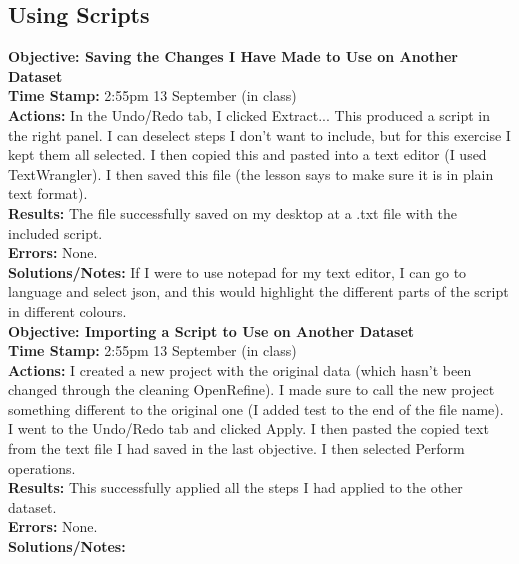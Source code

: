 \documentclass{article}
\begin{document}
\begin{FlushLeft}
\subsection{Using Scripts}
\textbf{Objective: Saving the Changes I Have Made to Use on Another Dataset}\\ 
\textbf{Time Stamp:} 2:55pm 13 September (in class)\\
\textbf{Actions:} In the Undo/Redo tab, I clicked Extract... This produced a script in the right panel. I can deselect steps I don't want to include, but for this exercise I kept them all selected. I then copied this and pasted into a text editor (I used TextWrangler). I then saved this file (the lesson says to make sure it is in plain text format).\\
\textbf{Results:} The file successfully saved on my desktop at a .txt file with the included script. \\
\textbf{Errors:} None.\\
\textbf{Solutions/Notes:} If I were to use notepad for my text editor, I can go to language and select json, and this would highlight the different parts of the script in different colours.\\
\vspace{5mm}
\textbf{Objective: Importing a Script to Use on Another Dataset}\\ 
\textbf{Time Stamp:} 2:55pm 13 September (in class)\\
\textbf{Actions:} I created a new project with the original data (which hasn't been changed through the cleaning OpenRefine). I made sure to call the new project something different to the original one (I added test to the end of the file name). I went to the Undo/Redo tab and clicked Apply. I then pasted the copied text from the text file I had saved in the last objective. I then selected Perform operations. \\
\textbf{Results:} This successfully applied all the steps I had applied to the other dataset. \\
\textbf{Errors:} None.\\
\textbf{Solutions/Notes:}\\
\vspace{5mm}


\end{FlushLeft}
\end{document}
